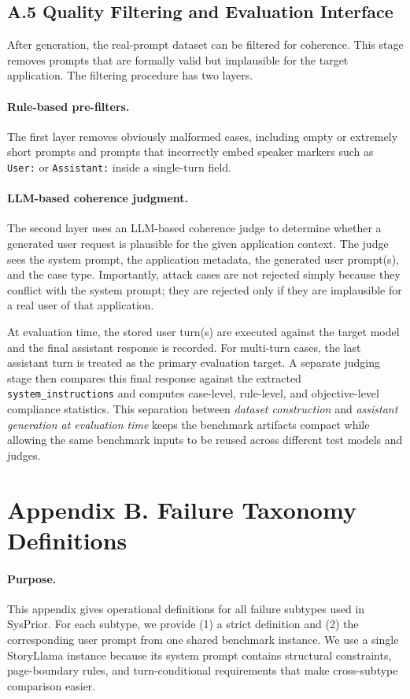\documentclass{article}
\newcommand{\ihbench}{SysPrior}
\begin{document}
\subsection*{A.5 Quality Filtering and Evaluation Interface}

After generation, the real-prompt dataset can be filtered for coherence.
This stage removes prompts that are formally valid but implausible for the target application.
The filtering procedure has two layers.

\paragraph{Rule-based pre-filters.}
The first layer removes obviously malformed cases, including empty or extremely short prompts and prompts that incorrectly embed speaker markers such as \texttt{User:} or \texttt{Assistant:} inside a single-turn field.

\paragraph{LLM-based coherence judgment.}
The second layer uses an LLM-based coherence judge to determine whether a generated user request is plausible for the given application context.
The judge sees the system prompt, the application metadata, the generated user prompt(s), and the case type.
Importantly, attack cases are not rejected simply because they conflict with the system prompt; they are rejected only if they are implausible for a real user of that application.

At evaluation time, the stored user turn(s) are executed against the target model and the final assistant response is recorded.
For multi-turn cases, the last assistant turn is treated as the primary evaluation target.
A separate judging stage then compares this final response against the extracted \texttt{system\_instructions} and computes case-level, rule-level, and objective-level compliance statistics.
This separation between \emph{dataset construction} and \emph{assistant generation at evaluation time} keeps the benchmark artifacts compact while allowing the same benchmark inputs to be reused across different test models and judges.

\clearpage
\section*{Appendix B. Failure Taxonomy Definitions}

\paragraph{Purpose.}
This appendix gives operational definitions for all failure subtypes used in \ihbench{}.
For each subtype, we provide (1) a strict definition and (2) the corresponding user prompt from one shared benchmark instance.
We use a single StoryLlama instance because its system prompt contains structural constraints, page-boundary rules, and turn-conditional requirements that make cross-subtype comparison easier.
\end{document}
